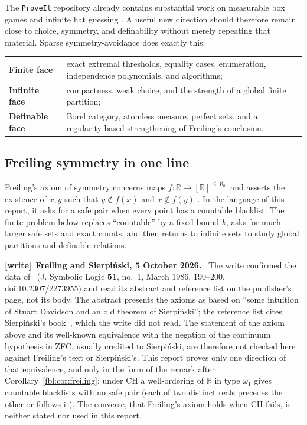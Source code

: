 \documentclass[11pt]{article}
\theoremstyle{definition}
\theoremstyle{remark}
\newcommand{\R}{\mathbb R}
\newenvironment{writenote}[1][]{\par\smallskip\begingroup\small
 \noindent\textbf{[write]}\if\relax\detokenize{#1}\relax\else~\textbf{#1.}\fi\ }%
 {\par\endgroup\smallskip}
\begin{document}
The \texttt{ProveIt} repository already contains substantial work on
measurable box games and infinite hat guessing \cite{ProveIt,ProveItBoxes}.
A useful new direction should therefore remain close to choice, symmetry,
and definability without merely repeating that material.  Sparse
symmetry-avoidance does exactly this:

\begin{center}
\begin{tabularx}{0.93\textwidth}{>{\bfseries}p{}X}
Finite face & exact extremal thresholds, equality cases, enumeration,
independence polynomials, and algorithms;\\
Infinite face & compactness, weak choice, and the strength of a global
finite partition;\\
Definable face & Borel category, atomless measure, perfect sets, and a
regularity-based strengthening of Freiling's conclusion.\\
\end{tabularx}
\end{center}

\subsection{Freiling symmetry in one line}\label{fbl:sec:freiling}
Freiling's axiom of symmetry concerns maps
$f:\R\to[\R]^{\le\aleph_0}$ and asserts the existence of $x,y$ such that
$y\notin f(x)$ and $x\notin f(y)$ \cite{Freiling}.  In the language of this
report, it asks for a safe pair when every point has a countable blacklist.
The finite problem below replaces ``countable'' by a fixed bound $k$, asks
for much larger safe sets and exact counts, and then returns to infinite sets
to study global partitions and definable relations.

\begin{writenote}[Freiling and Sierpi\'nski, 5 October 2026]
The write confirmed the data of~\cite{Freiling} (J. Symbolic Logic
\textbf{51}, no.~1, March 1986, 190--200, doi:10.2307/2273955) and read its
abstract and reference list on the publisher's page, not its body. The
abstract presents the axioms as based on ``some intuition of Stuart Davidson
and an old theorem of Sierpi\'nski''; the reference list cites
Sierpi\'nski's book~\cite{Sierpinski}, which the write did not read. The
statement of the axiom above and its well-known equivalence with the
negation of the continuum hypothesis in ZFC, usually credited to
Sierpi\'nski, are therefore not checked here against Freiling's text or
Sierpi\'nski's. This report proves only one direction of that
equivalence, and only in the form of the remark after
Corollary~\ref{fbl:cor:freiling}: under CH a well-ordering of $\R$ in type
$\omega_1$ gives countable blacklists with no safe pair (each of two
distinct reals precedes the other or follows it). The converse, that
Freiling's axiom holds when CH fails, is neither stated nor used in this
report.
\end{writenote}
\end{document}
